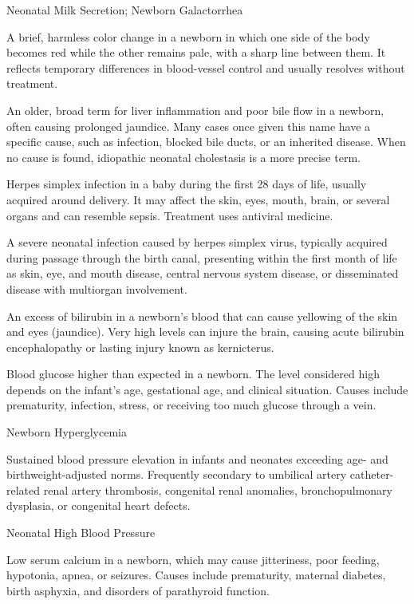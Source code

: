 \synonyms
Neonatal Milk Secretion; Newborn Galactorrhea

 A brief, harmless color change in a newborn in which one side of the body becomes red while the other remains pale, with a sharp line between them. It reflects temporary differences in blood-vessel control and usually resolves without treatment.

 An older, broad term for liver inflammation and poor bile
flow in a newborn, often causing prolonged jaundice. Many cases once given this name
have a specific cause, such as infection, blocked bile ducts, or an inherited disease.
When no cause is found, idiopathic neonatal cholestasis is a more precise term.

 Herpes simplex infection in a baby during the first 28 days of life, usually acquired around delivery. It may affect the skin, eyes, mouth, brain, or several organs and can resemble sepsis. Treatment uses antiviral medicine.

 A severe neonatal infection caused by herpes simplex virus, typically acquired during
passage through the birth canal, presenting within the first month of life as skin, eye,
and mouth disease, central nervous system disease, or disseminated disease with
multiorgan involvement.

 An excess of bilirubin in a newborn's blood that can cause yellowing of the skin and eyes (jaundice). Very high levels can injure the brain, causing acute bilirubin encephalopathy or lasting injury known as kernicterus.

 Blood glucose higher than expected in a newborn. The level considered high depends on the infant's age, gestational age, and clinical situation. Causes include prematurity, infection, stress, or receiving too much glucose through a vein.

\synonyms
Newborn Hyperglycemia

 Sustained blood pressure elevation in infants and neonates exceeding age- and birthweight-adjusted norms. Frequently secondary to umbilical artery catheter-related renal artery thrombosis, congenital renal anomalies, bronchopulmonary dysplasia, or congenital heart defects.

\synonyms
Neonatal High Blood Pressure

 Low serum calcium in a newborn, which may cause jitteriness, poor feeding, hypotonia, apnea, or seizures. Causes include prematurity, maternal diabetes, birth asphyxia, and disorders of parathyroid function.

